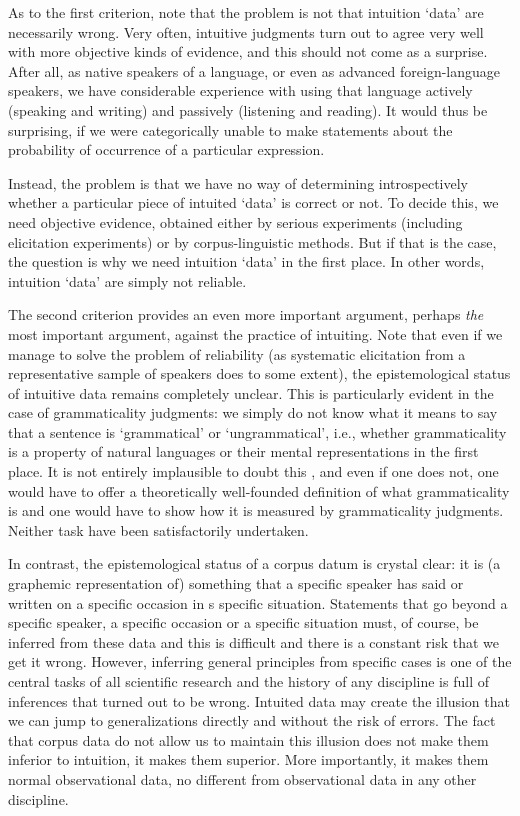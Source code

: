 As to the first criterion, note that the problem is not that intuition `data' are necessarily wrong. Very often, intuitive judgments turn out to agree very well with more objective kinds of evidence, and this should not come as a surprise. After all, as native speakers of a language, or even as advanced foreign-language speakers, we have considerable experience with using that language actively (speaking and writing) and passively (listening and reading). It would thus be surprising, if we were categorically unable to make statements about the probability of occurrence of a particular expression.

Instead, the problem is that we have no way of determining introspectively whether a particular piece of intuited `data' is correct or not. To decide this, we need objective evidence, obtained either by serious experiments (including elicitation experiments) or by corpus-linguistic methods. But if that is the case, the question is why we need intuition `data' in the first place. In other words, intuition `data' are simply not reliable.

The second criterion provides an even more important argument, perhaps \emph{the} most important argument, against the practice of intuiting. Note that even if we manage to solve the problem of reliability (as systematic elicitation from a representative sample of speakers does to some extent), the epistemological status of intuitive data remains completely unclear. This is particularly evident in the case of grammaticality judgments: we simply do not know what it means to say that a sentence is `grammatical' or `ungrammatical', i.e., whether grammaticality is a property of natural languages or their mental representations in the first place. It is not entirely implausible to doubt this \citep[cf.][]{sampson_evidence_1987}, and even if one does not, one would have to offer a theoretically well-founded definition of what grammaticality is and one would have to show how it is measured by grammaticality judgments. Neither task have been satisfactorily undertaken.

In contrast, the epistemological status of a corpus datum is crystal clear: it is (a graphemic representation of) something that a specific speaker has said or written on a specific occasion in s specific situation. Statements that go beyond a specific speaker, a specific occasion or a specific situation must, of course, be inferred from these data and this is difficult and there is a constant risk that we get it wrong. However, inferring general principles from specific cases is one of the central tasks of all scientific research and the history of any discipline is full of inferences that turned out to be wrong. Intuited data may create the illusion that we can jump to generalizations directly and without the risk of errors. The fact that corpus data do not allow us to maintain this illusion does not make them inferior to intuition, it makes them superior. More importantly, it makes them normal observational data, no different from observational data in any other discipline.

